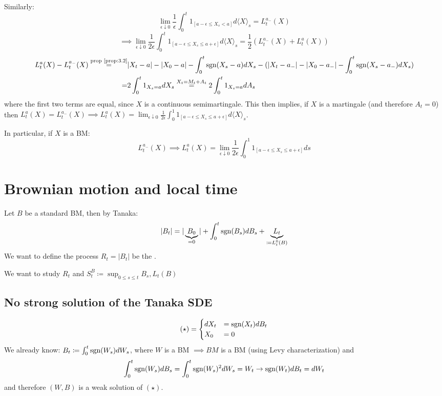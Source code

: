 Similarly: 
\[\lim_{\epsilon\downarrow 0}\frac{1}{\epsilon}\int_0^t 1_{[a-\epsilon\leq X_s<a]}d\langle X\rangle_s = L_t^{a_-}(X)\]
\[\implies \lim_{\epsilon\downarrow 0}\frac{1}{2\epsilon}\int_0^t 1_{[a-\epsilon\leq X_s\leq a+\epsilon]}d\langle X\rangle_s=\frac{1}{2}(L_t^{a_-}(X)+L_t^a(X))\]
\begin{align*}
    L_t^a(X)-L_t^{a_-}(X)\stackrel{\text{prop \ref{prop:3.2}}}{=}& |X_t-a|-|X_0-a|-\int_0^t \text{sgn}(X_s-a)dX_s-(|X_t-a_-|-|X_0-a_-|-\int_0^t \text{sgn}(X_s-a_-)dX_s)\\
    =&2\int_0^t 1_{X_s=a}dX_s\stackrel{X_t=M_t+A_t}{=}2\int_0^t 1_{X_s=a}dA_s
\end{align*}
where the first two terms are equal, since $X$ is a continuous semimartingale. This then implies, if $X$ is a martingale (and therefore $A_t=0$)
then $L_t^a(X)=L_t^{a_-}(X)\implies L_t^a(X)=\lim_{\epsilon\downarrow 0}\frac{1}{2\epsilon}\int_0^1 1_{[a-\epsilon\leq X_s\leq a+\epsilon]}d\langle X \rangle_s$.

In particular, if $X$ is a BM: 
\[L_t^{a_-}(X)\implies L_t^a(X)=\lim_{\epsilon\downarrow 0}\frac{1}{2\epsilon}\int_0^1 1_{[a-\epsilon\leq X_s\leq a+\epsilon]}ds\]

\section{Brownian motion and local time}

Let $B$ be a standard BM, then by Tanaka: 
\[|B_t|=|\underbrace{B_0}_{=0}|+\int_0^t \text{sgn}(B_s)dB_s+\underbrace{L_t}_{\coloneqq L_t^0(B)}\]
We want to define the process $R_t=|B_t|$ be the .

We want to study $R_t$ and $S_t^B\coloneqq \sup_{0\leq s\leq t} B_s,L_t(B)$

\subsection{No strong solution of the Tanaka SDE}

\[(\star)=\begin{cases}
    dX_t &= \text{sgn}(X_t)dB_t\\
    X_0&=0
\end{cases}\]
We already know: $B_t\coloneqq \int_0^t \text{sgn}(W_s)dW_s$, where $W$ is a BM $\implies BM$ is a BM (using Levy characterization)
and \[\int_0^t\text{sgn}(W_s)dB_s=\int_0^t \text{sgn}(W_s)^2dW_s=W_t\to \text{sgn}(W_t)dB_t=dW_t\]
and therefore $(W,B)$ is a weak solution of $(\star)$.

